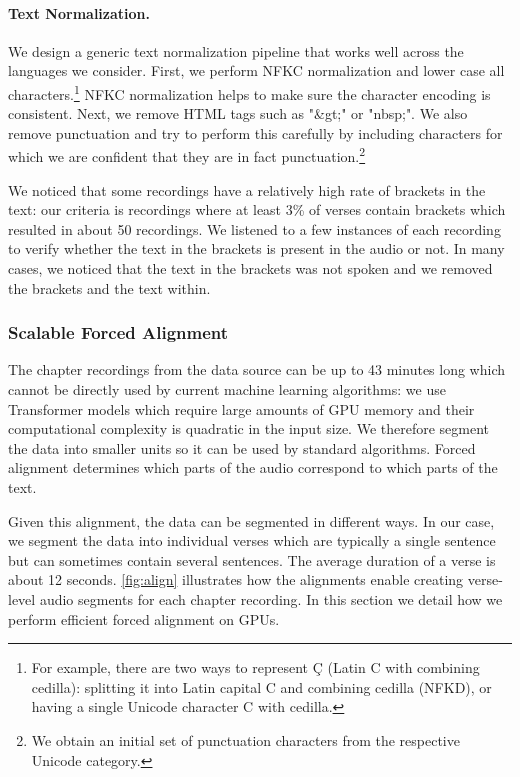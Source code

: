 \paragraph{Text Normalization.}
We design a generic text normalization pipeline that works well across the languages we consider. 
First, we perform NFKC normalization and lower case all characters.\footnote{
For example, there are two ways to represent Ç (Latin C with combining cedilla): splitting it into Latin capital C and combining cedilla (NFKD), or having a single Unicode character C with cedilla.} 
NFKC normalization helps to make sure the character encoding is consistent.
Next, we remove HTML tags such as "\&gt;" or "nbsp;".
We also remove punctuation and try to perform this carefully by including characters for which we are confident that they are in fact punctuation.\footnote{We obtain an initial set of punctuation characters from the respective Unicode category.}

We noticed that some recordings have a relatively high rate of brackets in the text: 
our criteria is recordings where at least 3\% of verses contain brackets which resulted in about 50 recordings. 
We listened to a few instances of each recording to verify whether the text in the brackets is present in the audio or not. 
In many cases, we noticed that the text in the brackets was not spoken and we removed the brackets and the text within.



\subsubsection{Scalable Forced Alignment}
\label{sec:data-align-algo}

The chapter recordings from the data source can be up to 43 minutes long which cannot be directly used by current machine learning algorithms:
we use Transformer models which require large amounts of GPU memory and their computational complexity is quadratic in the input size.
We therefore segment the data into smaller units so it can be used by standard algorithms.
Forced alignment determines which parts of the audio correspond to which parts of the text.

Given this alignment, the data can be segmented in different ways.
In our case, we segment the data into individual verses which are typically a single sentence but can sometimes contain several sentences. 
The average duration of a verse is about 12 seconds.
\autoref{fig:align} illustrates how the alignments enable creating verse-level audio segments for each chapter recording. 
In this section we detail how we perform efficient forced alignment on GPUs.


